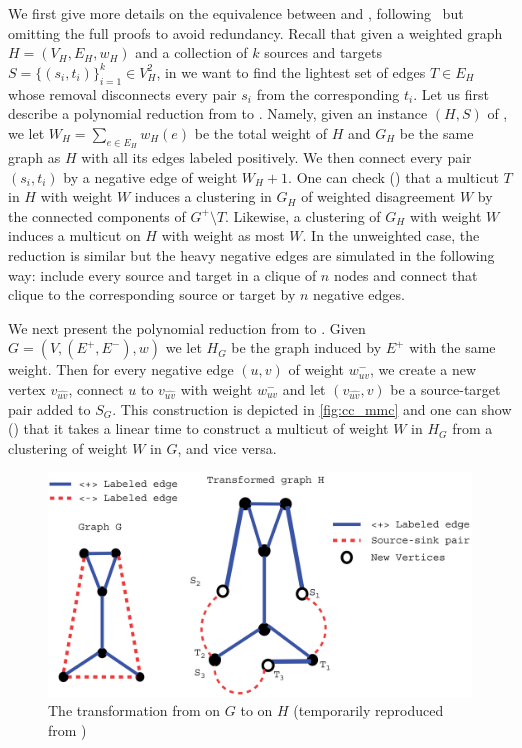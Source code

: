 We first give more details on the equivalence between \mmc{} and \pcc{},
following~\autocite{Demaine2006} but omitting the full proofs to avoid redundancy. Recall that given
a weighted graph $H=(V_H, E_H, w_H)$ and a collection of $k$ sources and targets
$S=\{(s_i,t_i)\}_{i=1}^k \in V_H^2$, in \mmc{} we want to find the lightest set of edges $T\in E_H$
whose removal disconnects every pair $s_i$ from the corresponding $t_i$. Let us first describe a
polynomial reduction from \mmc{} to \pcc{}. Namely, given an instance $(H, S)$ of \mmc{}, we let
$W_H=\sum_{e\in E_H} w_H(e)$ be the total weight of $H$ and $G_H$ be the same graph as $H$ with all
its edges labeled positively. We then connect every pair $(s_i, t_i)$ by a negative edge of weight
$W_H+1$. One can check (\autocite[Theorem 4.7]{Demaine2006}) that a multicut $T$ in $H$ with weight
$W$ induces a clustering in $G_H$ of weighted disagreement $W$ by the connected components of
$G^+\setminus T$. Likewise, a clustering of $G_H$ with weight $W$ induces a multicut on $H$ with
weight as most $W$. In the unweighted case, the reduction is similar but the heavy negative edges
are simulated in the following way: include every source and target in a clique of $n$ nodes and
connect that clique to the corresponding source or target by $n$ negative edges.

We next present the polynomial reduction from \pcc{} to \mmc{}. Given $G=(V, (E^+, E^-), w)$ we let
$H_G$ be the graph induced by $E^+$ with the same weight. Then for every negative edge $(u,v)$ of
weight $w_{uv}^-$, we create a new vertex $v_{\widehat{uv}}$, connect $u$ to $v_{\widehat{uv}}$ with
weight $w_{uv}^-$ and let $(v_{\widehat{uv}}, v)$ be a source-target pair added to $S_G$. This
construction is depicted in \autoref{fig:cc_mmc} and one can show (\autocite[Theorem
4.4]{Demaine2006}) that it takes a linear time to construct a
multicut of weight $W$ in $H_G$ from a clustering of weight $W$ in $G$, and vice versa.

\begin{figure}[htpb]
   \centering
   \includegraphics[width=0.8\linewidth]{assets/raw/cc_to_mmc.png}
   \caption{The transformation from \pcc{} on $G$ to \mmc{} on $H$ (temporarily reproduced from
   \autocite{Demaine2006}) \label{fig:cc_mmc}}
\end{figure}


